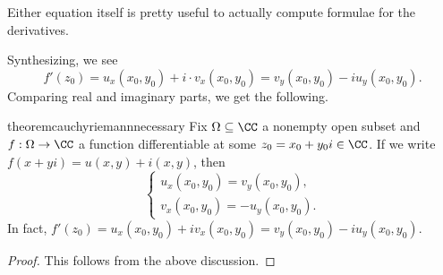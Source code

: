\begin{remark}
	Either equation itself is pretty useful to actually compute formulae for the derivatives.
\end{remark}
Synthesizing, we see
\[f'(z_0)=u_x(x_0,y_0)+i\cdot v_x(x_0,y_0)=v_y(x_0,y_0)-iu_y(x_0,y_0).\]
Comparing real and imaginary parts, we get the following.
\begin{restatable}{theorem}{cauchyriemannnecessary} \label{thm:crnecessary}
	Fix $\Omega\subseteq\CC$ a nonempty open subset and $f:\Omega\to\CC$ a function differentiable at some $z_0=x_0+y_0i\in\CC$. If we write $f(x+yi)=u(x,y)+i(x,y)$, then
	\[\begin{cases}
		u_x(x_0,y_0)=v_y(x_0,y_0), \\
		v_x(x_0,y_0)=-u_y(x_0,y_0).
	\end{cases}\]
	In fact, $f'(z_0)=u_x(x_0,y_0)+iv_x(x_0,y_0)=v_y(x_0,y_0)-iu_y(x_0,y_0)$.
\end{restatable}
\begin{proof}
	This follows from the above discussion.
\end{proof}

